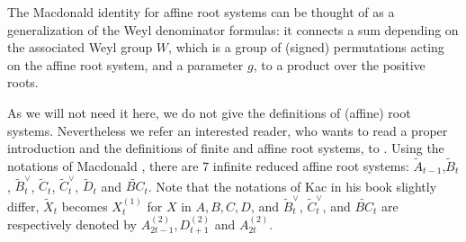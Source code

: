 \documentclass[11pt,letterpaper]{amsart}
\def\bbbr{\mathbb R}
\numberwithin{equation}{section}
\numberwithin{df}{section}
\begin{document}
%

The Macdonald identity for affine root systems can be thought of as a generalization of the Weyl denominator formulas: it connects a sum depending on the associated Weyl group $W$, which is a group of (signed) permutations acting on the affine root system, and a parameter $g$, to a product over the positive roots. 

As we will not need it here, we do not give the definitions of (affine) root systems. Nevertheless we refer an interested reader, who wants to read a proper introduction and the definitions of finite and affine root systems, to \cite[Part $I$ Chapter $2$]{Bartphd}. Using the notations of Macdonald \cite{Mac}, there are $7$ infinite reduced affine root systems: $\tilde{A}_{t-1}$,$\tilde{B}_t$, $\tilde{B}^{\vee}_t$, $\tilde{C}_t$, $\tilde{C}^{\vee}_t$, $\tilde{D}_t$ and $\widetilde{BC}_t$. Note that the notations of Kac in his book \cite[p.80]{KacB} slightly differ, $\tilde{X}_t$ becomes $X_t^{(1)}$ for $X$ in $A,B,C,D$, and $\tilde{B}^{\vee}_t$, $\tilde{C}^{\vee}_t$, and $\widetilde{BC}_t$ are respectively denoted by $A_{2t-1}^{(2)},D_{t+1}^{(2)}$ and $A_{2t}^{(2)}$.




\end{document}
